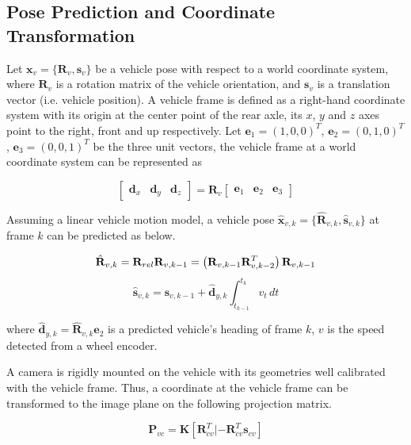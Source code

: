 \documentclass[letterpaper, 10 pt, conference]{ieeeconf}  %
\begin{document}
\subsection{Pose Prediction and Coordinate Transformation}
Let $\mathbf{x}_{v} = \{\mathbf{R}_{v}, \mathbf{s}_{v}\}$ be a vehicle pose with respect to a world coordinate system, where $\mathbf{R}_{v}$ is a rotation matrix of the vehicle orientation, and $\mathbf{s}_{v}$ is a translation vector (i.e. vehicle position).
A vehicle frame is defined as a right-hand coordinate system with its origin at the center point of the rear axle, its $x$, $y$ and $z$ axes point to the right, front and up respectively. Let $\mathbf{e}_1=(1,0,0)^T$, $\mathbf{e}_2=(0,1,0)^T$, $\mathbf{e}_3=(0,0,1)^T$ be the three unit vectors, the vehicle frame at a world coordinate system can be represented as

\begin{equation}
\begin{bmatrix} \mathbf{d}_x & \mathbf{d}_y & \mathbf{d}_z \end{bmatrix}
= \mathbf{R}_v
\begin{bmatrix} \mathbf{e}_1 & \mathbf{e}_2 & \mathbf{e}_3 \end{bmatrix}
\end{equation}

Assuming a linear vehicle motion model, a vehicle pose $\hat{\mathbf{x}}_{v,k}=\{\hat{\mathbf{R}}_{v,k},\hat{\mathbf{s}}_{v,k}\}$ at frame $k$ can be predicted as below.

\begin{equation}
\hat{\mathbf{R}}_{v,k}=\mathbf{R}_{rel}\mathbf{R}_{v,k-1}=\left(\mathbf{R}_{v,k-1}\mathbf{R}_{v,k-2}^T\right)\mathbf{R}_{v,k-1}\\
\label{eq:R_t_predict}
\end{equation}
\begin{equation}
\hat{\mathbf{s}}_{v,k}= \mathbf{s}_{v,k-1} + \hat{\mathbf{d}}_{y,k} \int_{t_{k-1}}^{t_k}{v_t}\,dt
\end{equation}

where $\hat{\mathbf{d}}_{y,k}=\hat{\mathbf{R}}_{v,k}\mathbf{e}_2$ is a predicted vehicle's heading of frame $k$, $v$ is the speed detected from a wheel encoder.

A camera is rigidly mounted on the vehicle with its geometries well calibrated with the vehicle frame. Thus, a coordinate at the vehicle frame can be transformed to the image plane on the following projection matrix.

\begin{equation}
\mathbf{P}_{vc}=\mathbf{K}[\mathbf{R}_{cv}^T|-\mathbf{R}_{cv}^T\mathbf{s}_{cv}]
\end{equation}
\end{document}

